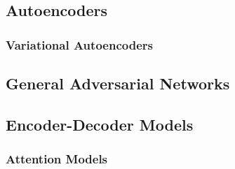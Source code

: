 \documentclass[twoside,twocolumn]{article}
\begin{document}
\subsection{Autoencoders}
\subsubsection{Variational Autoencoders}
\subsection{General Adversarial Networks}
\subsection{Encoder-Decoder Models}
\subsubsection{Attention Models}



% 
% 

\end{document}
